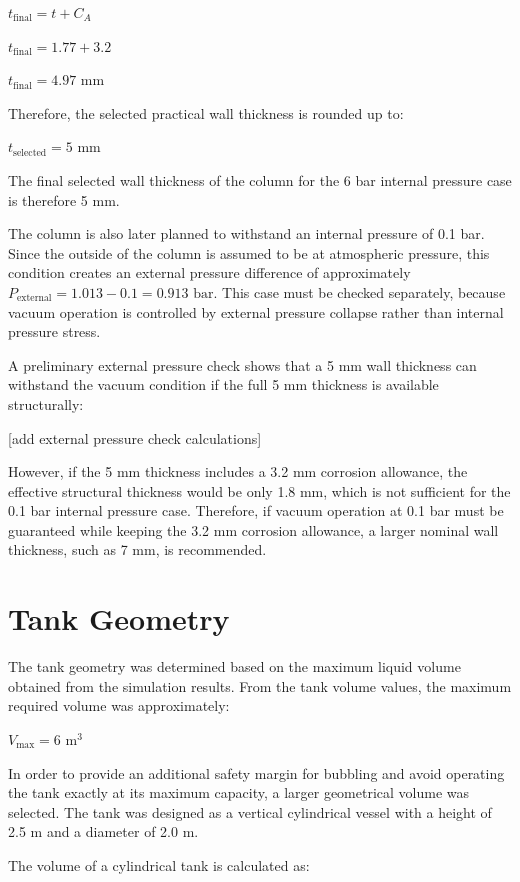 \(t_{\text{final}} = t + C_A\)

\(t_{\text{final}} = 1.77 + 3.2\)

\(t_{\text{final}} = 4.97 \text{ mm}\)

Therefore, the selected practical wall thickness is rounded up to:

\(t_{\text{selected}} = 5 \text{ mm}\)

The final selected wall thickness of the column for the 6 bar internal
pressure case is therefore 5 mm.

The column is also later planned to withstand an internal pressure of
0.1 bar. Since the outside of the column is assumed to be at atmospheric
pressure, this condition creates an external pressure difference of
approximately \(P_{\text{external}} = 1.013 - 0.1 = 0.913 \text{ bar}\).
This case must be checked separately, because vacuum operation is
controlled by external pressure collapse rather than internal pressure
stress.

A preliminary external pressure check shows that a 5 mm wall thickness
can withstand the vacuum condition if the full 5 mm thickness is
available structurally:

{[}add external pressure check calculations{]}

However, if the 5 mm thickness includes a 3.2 mm corrosion allowance,
the effective structural thickness would be only 1.8 mm, which is not
sufficient for the 0.1 bar internal pressure case. Therefore, if vacuum
operation at 0.1 bar must be guaranteed while keeping the 3.2 mm
corrosion allowance, a larger nominal wall thickness, such as 7 mm, is
recommended.

\section{Tank Geometry}\label{tank-geometry}

The tank geometry was determined based on the maximum liquid volume
obtained from the simulation results. From the tank volume values, the
maximum required volume was approximately:

\(V_{\text{max}} = 6 \text{ m}^3\)

In order to provide an additional safety margin for bubbling and avoid
operating the tank exactly at its maximum capacity, a larger geometrical
volume was selected. The tank was designed as a vertical cylindrical
vessel with a height of 2.5 m and a diameter of 2.0 m.

The volume of a cylindrical tank is calculated as:

